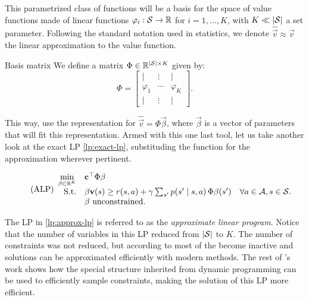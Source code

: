 This parametrized class of functions will be a basis for the space of value
functions made of linear functions $\varphi_i : \mathcal{S} \to \mathbb{R}$ for $i = 1,
\dots, K$, with $K \ll |\mathcal{S}|$ a set parameter. Following the standard
notation used in statistics, we denote $\widehat{\vec{v}} \approx \vec{v}$ the
linear approximation to the value function.

\begin{dfn}{Basis matrix}{}
    We define a matrix $\Phi \in \mathbb{R}^{|\mathcal{S}| \times K}$ given by:
    \begin{equation*}
        \Phi =
        \begin{bmatrix}
            | & \vdots & | \\
            \varphi_1 & \cdots & \varphi_K \\
            | & \vdots & |
        \end{bmatrix}.
    \end{equation*}
\end{dfn}

This way, use the representation for $\widehat{\vec{v}} = \Phi \vec{\beta}$,
where $\vec{\beta}$ is a vector of parameters that will fit this representation.
Armed with this one last tool, let us take another look at the exact LP
\eqref{lp:exact-lp}, substituding the function for the approximation wherever
pertinent.

\begin{equation}
\label{lp:approx-lp}
\tag{ALP}
\begin{array}{rl@{}ll}
    \displaystyle \min_{\vec{\beta} \in \R^{K}} & \vec{c}^{\top} \Phi \vec{\beta} \\
    \text{S.t.} & \vec{\beta}\vec{v} (s) \geq r(s,a) + \gamma \sum_{s'} p(s' \mid s, a) \, \Phi \vec{\beta} (s') & \quad \forall a \in \Actions, s \in \States. \\
    & \vec{\beta} \text{ unconstrained}.
\end{array}
\end{equation}

The LP in \eqref{lp:approx-lp} is referred to as the \textit{approximate linear
program}. Notice that the number of variables in this LP reduced from
$|\mathcal{S}|$ to $K$. The number of constraints was not reduced, but according to
\cite{farias2002thesis} most of the become inactive and solutions can be
approximated efficiently with modern methods. The rest of
\citeauthor{farias2002thesis}'s work shows how the special structure inherited
from dynamic programming can be used to efficiently sample constraints, making
the solution of this LP more efficient.

